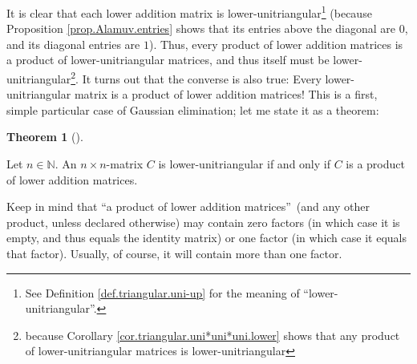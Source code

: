 \documentclass[numbers=enddot,12pt,final,onecolumn,notitlepage]{scrartcl}%
\theoremstyle{definition}
\newtheorem{theo}{Theorem}[section]
\newenvironment{theorem}[1][]
{\begin{theo}[#1]\begin{leftbar}}
{\end{leftbar}\end{theo}}
\begin{document}
It is clear that each lower addition matrix is
lower-unitriangular\footnote{See Definition \ref{def.triangular.uni-up} for
the meaning of \textquotedblleft lower-unitriangular\textquotedblright.}
(because Proposition \ref{prop.Alamuv.entries} shows that its entries above
the diagonal are $0$, and its diagonal entries are $1$). Thus, every product
of lower addition matrices is a product of lower-unitriangular matrices, and
thus itself must be lower-unitriangular\footnote{because Corollary
\ref{cor.triangular.uni*uni*uni.lower} shows that any product of
lower-unitriangular matrices is lower-unitriangular}. It turns out that the
converse is also true: Every lower-unitriangular matrix is a product of lower
addition matrices! This is a first, simple particular case of Gaussian
elimination; let me state it as a theorem:

\begin{theorem}
\label{thm.triangular.Alamuv}Let $n\in\mathbb{N}$. An $n\times n$-matrix $C$
is lower-unitriangular if and only if $C$ is a product of lower addition matrices.
\end{theorem}

Keep in mind that \textquotedblleft a product of lower addition
matrices\textquotedblright\ (and any other product, unless declared otherwise)
may contain zero factors (in which case it is empty, and thus equals the
identity matrix) or one factor (in which case it equals that factor). Usually,
of course, it will contain more than one factor.
\end{document}
